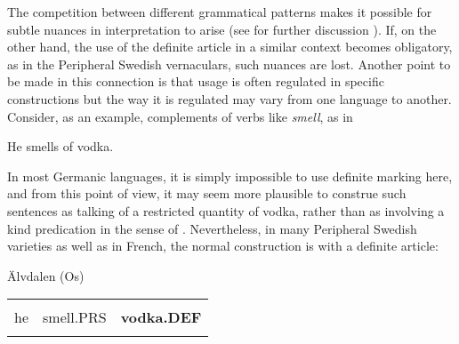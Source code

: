 \begin{styleBodytextC}
The competition between different grammatical patterns makes it possible for subtle nuances in interpretation to arise (see for further discussion \citet[128-134]{Dahl2004}). If, on the other hand, the use of the definite article in a similar context becomes obligatory, as in the Peripheral Swedish vernaculars, such nuances are lost. Another point to be made in this connection is that usage is often regulated in specific constructions but the way it is regulated may vary from one language to another. Consider, as an example, complements of verbs like \textit{smell}, as in

\end{styleBodytextC}


\begin{listWWNumileveli}
\item {}

\begin{styleExample}
He smells of vodka.

\end{styleExample}

\end{listWWNumileveli}

\begin{styleBodyTextFirst}
In most Germanic languages, it is simply impossible to use definite marking here, and from this point of view, it may seem more plausible to construe such sentences as talking of a restricted quantity of vodka, rather than as involving a kind predication in the sense of \citet{KrifkaEtAl1995}. Nevertheless, in many Peripheral Swedish varieties as well as in French, the normal construction is with a definite article: 

\end{styleBodyTextFirst}

\begin{listWWNumileveli}
\item {}

\begin{styleExample}
Älvdalen (Os)

\end{styleExample}

\end{listWWNumileveli}

\begin{tabular}{lll}
\lsptoprule
\multicolumn{3}{l}{An

}\\
he & smell.PRS & {\bfseries vodka.DEF}\\
\lspbottomrule
\end{tabular}


